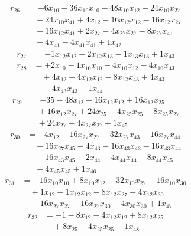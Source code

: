 \[\begin{aligned}
r_{26} &= + 6 x_{10} - 36 x_{10} x_{10} - 48 x_{10} x_{12} - 24 x_{10} x_{27} \\
 &\quad - 24 x_{10} x_{41} + 4 x_{12} - 16 x_{12} x_{12} - 16 x_{12} x_{27} \\
 &\quad - 16 x_{12} x_{41} + 2 x_{27} - 4 x_{27} x_{27} - 8 x_{27} x_{41} \\
 &\quad + 4 x_{41} - 4 x_{41} x_{41} + 1 x_{42}
\end{aligned}\]
\[\begin{aligned}
r_{27} &= - 1 x_{12} x_{12} - 2 x_{12} x_{13} - 1 x_{13} x_{13} + 1 x_{43}
\end{aligned}\]
\[\begin{aligned}
r_{28} &= + 2 x_{10} - 1 x_{10} x_{10} - 4 x_{10} x_{12} - 4 x_{10} x_{43} \\
 &\quad + 4 x_{12} - 4 x_{12} x_{12} - 8 x_{12} x_{43} + 4 x_{43} \\
 &\quad - 4 x_{43} x_{43} + 1 x_{44}
\end{aligned}\]
\[\begin{aligned}
r_{29} &= - 35 - 48 x_{12} - 16 x_{12} x_{12} + 16 x_{12} x_{25} \\
 &\quad + 16 x_{12} x_{27} + 24 x_{25} - 4 x_{25} x_{25} - 8 x_{25} x_{27} \\
 &\quad + 24 x_{27} - 4 x_{27} x_{27} + 1 x_{45}
\end{aligned}\]
\[\begin{aligned}
r_{30} &= - 4 x_{12} - 16 x_{27} x_{27} - 32 x_{27} x_{43} - 16 x_{27} x_{44} \\
 &\quad - 16 x_{27} x_{45} - 4 x_{43} - 16 x_{43} x_{43} - 16 x_{43} x_{44} \\
 &\quad - 16 x_{43} x_{45} - 2 x_{44} - 4 x_{44} x_{44} - 8 x_{44} x_{45} \\
 &\quad - 4 x_{45} x_{45} + 1 x_{46}
\end{aligned}\]
\[\begin{aligned}
r_{31} &= - 16 x_{10} x_{10} + 8 x_{10} x_{12} + 32 x_{10} x_{27} + 16 x_{10} x_{30} \\
 &\quad + 1 x_{12} - 1 x_{12} x_{12} - 8 x_{12} x_{27} - 4 x_{12} x_{30} \\
 &\quad - 16 x_{27} x_{27} - 16 x_{27} x_{30} - 4 x_{30} x_{30} + 1 x_{47}
\end{aligned}\]
\[\begin{aligned}
r_{32} &= - 1 - 8 x_{12} - 4 x_{12} x_{12} + 8 x_{12} x_{25} \\
 &\quad + 8 x_{25} - 4 x_{25} x_{25} + 1 x_{48}
\end{aligned}\]
